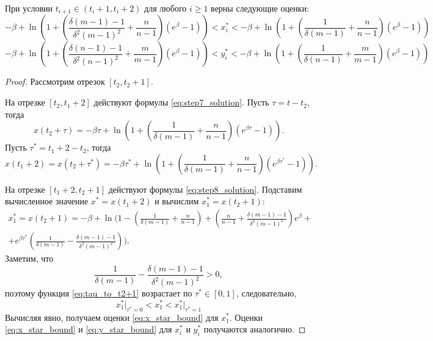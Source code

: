 \begin{lemma}
	\label{lm:xy_star_bounds}
	При условии $t_{i + 1} \in (t_i + 1, t_i + 2)$ для любого $i \geqslant 1$ верны следующие оценки:
	\footnotesize
	\begin{equation}
		\label{eq:x_star_bound}
		-\beta + \ln\left(1 + \left( \frac{\delta(m - 1) - 1}{\delta^2 (m - 1)^2} + \dfrac{n}{n - 1} \right)(e^{\beta} - 1) \right) < x^*_i < -\beta + \ln\left(1 + \left( \dfrac{1}{\delta(m - 1)} + \dfrac{n}{n - 1} \right)(e^{\beta} - 1) \right)
	\end{equation}
	\begin{equation}
		\label{eq:y_star_bound}
		-\beta + \ln\left(1 + \left( \frac{\delta(n - 1) - 1}{\delta^2 (n - 1)^2} + \dfrac{m}{m - 1} \right)(e^{\beta} - 1) \right) < y^*_i < -\beta + \ln\left(1 + \left( \dfrac{1}{\delta(n - 1)} + \dfrac{m}{m - 1} \right)(e^{\beta} - 1) \right)
	\end{equation}
	\normalsize
\end{lemma}
\begin{proof}
	Рассмотрим отрезок $[t_2, t_2 + 1]$.
	
	На отрезке $[t_2, t_1 + 2]$ действуют формулы \eqref{eq:step7_solution}. Пусть $\tau = t - t_2$, тогда
	\[
	x(t_2 + \tau) = - \beta \tau + \ln\left( 1 + \left(\dfrac{1}{\delta(m - 1)} + \dfrac{n}{n - 1}\right) (e^{\beta \tau} - 1) \right).
	\]
	Пусть $\tau^* = t_1 + 2 - t_2$, тогда
	\[
	x(t_1 + 2) = x(t_2 + \tau^*) = -\beta \tau^* + \ln\left( 1 + \left(\dfrac{1}{\delta(m - 1)} + \dfrac{n}{n - 1}\right) (e^{\beta \tau^*} - 1) \right).
	\]
	
	На отрезке $[t_1 + 2, t_2 + 1]$ действуют формулы \eqref{eq:step8_solution}. Подставим вычисленное значение $x^* = x(t_1 + 2)$ и вычислим $x^*_1 = x(t_2 + 1)$:
	\begin{multline}
		\label{eq:tau_to_t2+1}
		x^*_1 = x(t_2 + 1) = -\beta + \ln\Bigg( 1 - \left(\frac{1}{\delta(m - 1)} + \frac{n}{n - 1}\right) + \left(\frac{n}{n - 1} + \frac{\delta(m - 1) - 1}{\delta^2 (m - 1)^2}\right) e^{\beta} + \\ + e^{\beta \tau^*} \left(\frac{1}{\delta(m - 1)} - \frac{\delta(m - 1) - 1}{\delta^2 (m - 1)^2}\right) \Bigg).
	\end{multline}
	Заметим, что 
	\[
	\frac{1}{\delta(m - 1)} - \frac{\delta(m - 1) - 1}{\delta^2 (m - 1)^2} > 0,
	\]
	поэтому функция \eqref{eq:tau_to_t2+1} возрастает по $\tau^* \in [0, 1]$, следовательно, 
	\[
	x^*_1 \vert_{\tau^* = 0} < x^*_1 < x^*_1 \vert_{\tau^* = 1}
	\]
	Вычисляя явно, получаем оценки \eqref{eq:x_star_bound} для $x_1^*$. Оценки \eqref{eq:x_star_bound} и \eqref{eq:y_star_bound} для $x_i^*$ и $y_i^*$ получаются аналогично. 
	
\end{proof}

